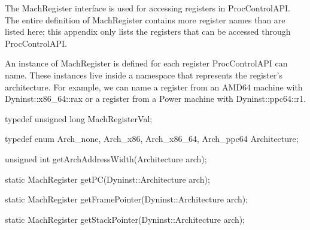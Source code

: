 
The MachRegister interface is used for accessing registers in
ProcControlAPI. The entire definition of MachRegister contains more register
names than are listed here; this appendix only lists the registers that can be
accessed through ProcControlAPI.

An instance of MachRegister is defined for each register ProcControlAPI can
name. These instances live inside a namespace that represents the
register's architecture. For example, we can name a
register from an AMD64 machine with Dyninst::x86\_64::rax or a register from a
Power machine with Dyninst::ppc64::r1.


\begin{apient}
typedef unsigned long MachRegisterVal;
\end{apient}


\begin{apient}
typedef enum { Arch_none, Arch_x86, Arch_x86_64, Arch_ppc64 } Architecture;
\end{apient}


\begin{apient}
unsigned int getArchAddressWidth(Architecture arch);
\end{apient}


\begin{apient}
static MachRegister getPC(Dyninst::Architecture arch);
\end{apient}


\begin{apient}
static MachRegister getFramePointer(Dyninst::Architecture arch);
\end{apient}


\begin{apient}
static MachRegister getStackPointer(Dyninst::Architecture arch);
\end{apient}

